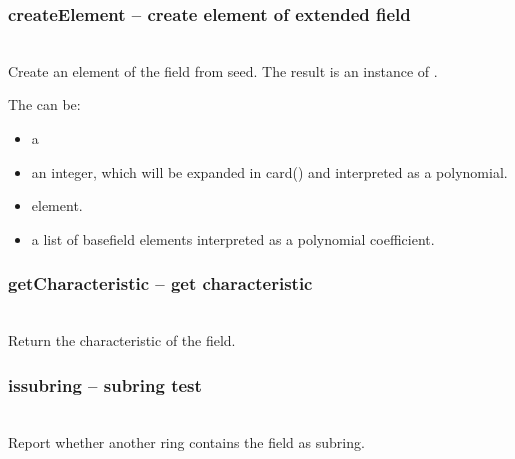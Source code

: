   \subsubsection{createElement -- create element of extended field}
   \\
   \spacing
   \quad Create an element of the field from seed. The result is an instance of .

   \quad The  can be:
 \begin{itemize}
 \item a 
 \item an integer, which will be expanded in card() and interpreted as a polynomial. 
 \item {} element. 
 \item a list of basefield elements interpreted as a polynomial coefficient.
 \end{itemize}
%
  \subsubsection{getCharacteristic -- get characteristic}
   \\
   \spacing
   \quad Return the characteristic of the field.
%
  \subsubsection{issubring -- subring test}
   \\
   \spacing
   \quad Report whether another ring contains the field as subring.
%
